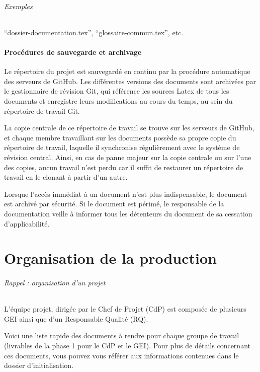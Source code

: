 \documentclass[a4paper]{article}
\begin{document}
\paragraph{Exemples} ``dossier-documentation.tex'', ``glossaire-commun.tex'', etc.

\subsection{Procédures de sauvegarde et archivage}

Le répertoire du projet est sauvegardé en continu par la procédure automatique des serveurs de GitHub. Les différentes versions des documents sont archivées par le gestionnaire de révision Git, qui référence les sources Latex de tous les documents et enregistre leurs modifications au cours du temps, au sein du répertoire de travail Git.

La copie centrale de ce répertoire de travail se trouve sur les serveurs de GitHub, et chaque membre travaillant sur les documents possède sa propre copie du répertoire de travail, laquelle il synchronise régulièrement avec le système de révision central. Ainsi, en cas de panne majeur sur la copie centrale ou sur l'une des copies, aucun travail n'est perdu car il suffit de restaurer un répertoire de travail en le clonant à partir d'un autre.

Lorsque l'accès immédiat à un document n'est plus indispensable, le document est archivé par sécurité. Si le document est périmé, le responsable de la documentation veille à informer tous les détenteurs du document de sa cessation d'applicabilité.

\part{Organisation de la production}

\paragraph{Rappel : organisation d'un projet} L'équipe projet, dirigée par le Chef de Projet (CdP) est composée de plusieurs GEI ainsi que d'un Responsable Qualité (RQ).

Voici une liste rapide des documents à rendre pour chaque groupe de travail (livrables de la phase 1 pour le CdP et le GEI). 
Pour plus de détails concernant ces documents, vous pouvez vous référer aux informations contenues dans le dossier d'initialisation.
\end{document}
